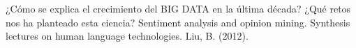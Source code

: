 \documentclass[reqno,twoside, 12pt]{report}
\begin{document}
%
\begin{thebibliography}{99}
	 ¿Cómo se explica el crecimiento del BIG DATA en la última década? ¿Qué retos nos ha planteado esta ciencia?
	 \hspace{-.22cm}  Sentiment analysis and opinion mining. Synthesis lectures on human language technologies. Liu, B. (2012).



\end{thebibliography}
\end{document}
